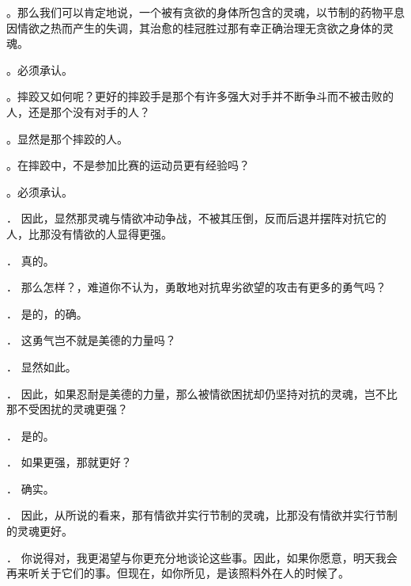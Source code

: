 。那么我们可以肯定地说，一个被有贪欲的身体所包含的灵魂，以节制的药物平息因情欲之热而产生的失调，其治愈的桂冠胜过那有幸正确治理无贪欲之身体的灵魂。\par

。必须承认。\par

。摔跤又如何呢？更好的摔跤手是那个有许多强大对手并不断争斗而不被击败的人，还是那个没有对手的人？\par

。显然是那个摔跤的人。\par

。在摔跤中，不是参加比赛的运动员更有经验吗？\par

。必须承认。\par

． 因此，显然那灵魂与情欲冲动争战，不被其压倒，反而后退并摆阵对抗它的人，比那没有情欲的人显得更强。\par

． 真的。\par

． 那么怎样？，难道你不认为，勇敢地对抗卑劣欲望的攻击有更多的勇气吗？\par

． 是的，的确。\par

． 这勇气岂不就是美德的力量吗？\par

． 显然如此。\par

． 因此，如果忍耐是美德的力量，那么被情欲困扰却仍坚持对抗的灵魂，岂不比那不受困扰的灵魂更强？\par

． 是的。\par

． 如果更强，那就更好？\par

． 确实。\par

． 因此，从所说的看来，那有情欲并实行节制的灵魂，比那没有情欲并实行节制的灵魂更好。\par

． 你说得对，我更渴望与你更充分地谈论这些事。因此，如果你愿意，明天我会再来听关于它们的事。但现在，如你所见，是该照料外在人的时候了。\par


